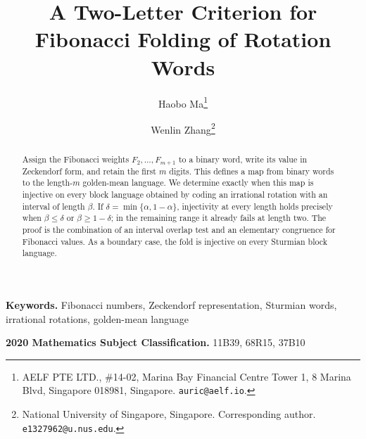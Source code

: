 \documentclass[11pt,letterpaper]{article}
\title{A Two-Letter Criterion for Fibonacci Folding of Rotation Words}
\author{Haobo Ma\thanks{AELF PTE LTD., \#14-02, Marina Bay Financial Centre
Tower 1, 8 Marina Blvd, Singapore 018981, Singapore.
\texttt{auric@aelf.io}.}
\and
Wenlin Zhang\thanks{National University of Singapore, Singapore.
Corresponding author. \texttt{e1327962@u.nus.edu}.}}
\date{}
\numberwithin{equation}{section}
\theoremstyle{plain}
\theoremstyle{definition}
\theoremstyle{remark}
\begin{document}
\maketitle

\begin{abstract}
Assign the Fibonacci weights \(F_2,\ldots,F_{m+1}\) to a binary word,
write its value in Zeckendorf form, and retain the first \(m\) digits.
This defines a map from binary words to the length-\(m\) golden-mean
language.  We determine exactly when this map is injective on every block
language obtained by coding an irrational rotation with an interval of
length \(\beta\).  If \(\delta=\min\{\alpha,1-\alpha\}\), injectivity at
every length holds precisely when
\(\beta\leq\delta\) or \(\beta\geq1-\delta\); in the remaining range it
already fails at length two.  The proof is the combination of an interval
overlap test and an elementary congruence for Fibonacci values.  As a
boundary case, the fold is injective on every Sturmian block language.
\end{abstract}

\medskip
\noindent\textbf{Keywords.} Fibonacci numbers, Zeckendorf representation,
Sturmian words, irrational rotations, golden-mean language

\medskip
\noindent\textbf{2020 Mathematics Subject Classification.}
11B39, 68R15, 37B10







\end{document}
